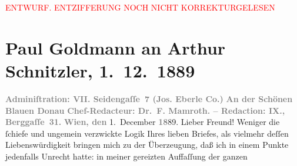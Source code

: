 
\begin{center}
            \textcolor{red}{ENTWURF. ENTZIFFERUNG NOCH NICHT KORREKTURGELESEN}
                      \end{center}
            
               \section[Paul Goldmann an Arthur Schnitzler, 1. 12. 1889]{ Paul Goldmann an Arthur Schnitzler, 1. 12. 1889}\nopagebreak{}\rehead{ }\begin{ledgroupsized}[t]{13cm}\normalsize\beginnumbering{} \toendnotes[C]{\smallbreak\pagebreak[2]} 
\toendnotes[C]{\smallbreak}\pstart
           \noindent{}\centering{}{\pb}\textcolor{gray}{\textbf{\textbf{Adminiſtration: VII.
                           Seidengaſſe 7} (Jos. Eberle {\kaufmannsund} Co.)}}\pend
           \pstart
           \noindent{}\centering{}\textcolor{gray}{\textbf{An der Schönen Blauen Donau}}\pend
           \pstart
           \noindent{}\centering{}\textcolor{gray}{\textbf{Chef-Redacteur: Dr. F.
                        Mamroth. – Redaction: IX.,
                        Berggaſſe 31.}}\pend
           \pstart
           \raggedleft{}\textcolor{gray}{\textbf{Wien, den}}{ }1. December \textcolor{gray}{\textbf{18}}89.\pend
           \pstart\center{}Lieber Freund!\pend\pstart
           Weniger die ſchiefe und ungemein verzwickte Logik Ihres lieben Briefes, als vielmehr
               deſſen Liebenswürdigkeit bringen mich zu der Überzeugung, daß ich in einem Punkte
               jedenfalls Unrecht hatte: in meiner gereizten Auffaſſung der ganzen \label{K_L02645-1v}
\end{ledgroupsized}
